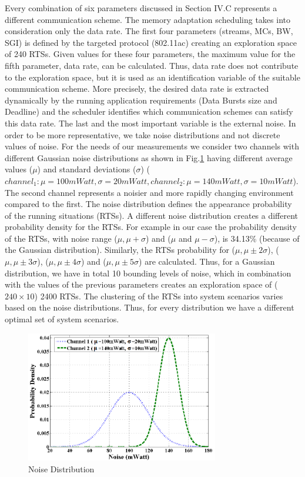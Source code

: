 Every combination of six parameters discussed in Section IV.C represents a different communication scheme. The memory adaptation scheduling takes into consideration only the data rate. The first four parameters (streams, MCs, BW, SGI) is defined by the targeted protocol (802.11ac) \cite{4} creating an exploration space of 240 RTSs. Given values for these four parameters, the maximum value for the fifth parameter, data rate, can be calculated. Thus, data rate does not contribute to the exploration space, but it is used as an identification variable of the suitable communication scheme. More precisely, the desired data rate is extracted dynamically by the running application requirements (Data Bursts size and Deadline) and the scheduler identifies which communication schemes can satisfy this data rate.  
The last and the most important variable is the external noise. In order to be more representative, we take noise distributions and not discrete values of noise.
 For the needs of our measurements we consider two channels with different Gaussian noise distributions as shown in Fig.\ref{fig:F7} having different average values ($\mu$) and standard deviations ($ \sigma $) ($channel_1: \mu  =100mWatt,  \sigma =20mWatt, channel_2:  \mu =140mWatt,  \sigma  = 10mWatt $). 
 The second channel represents a noisier and more rapidly changing environment compared to the first. 
 The noise distribution defines the appearance probability of the running situations (RTSs). 
 A different noise distribution creates a different probability density for the RTSs. For example in our case the probability density of the RTSs, with noise range ($\mu, \mu + \sigma$) and ($\mu$ and $\mu - \sigma$), is 34.13\% (because of the Gaussian distribution). 
 Similarly, the RTSs probability for ($\mu, \mu \pm 2 \sigma$),  ($\mu, \mu \pm 3 \sigma $), ($\mu, \mu \pm 4 \sigma$) and ($\mu, \mu \pm 5 \sigma $) are calculated. 
 Thus, for a Gaussian distribution, we have in total 10 bounding levels of noise, which in combination with the values of the previous parameters creates an exploration space of ($240 \times 10$) 2400 RTSs. The clustering of the RTSs into system scenarios varies based on the noise distributions. Thus, for every distribution we have a different optimal set of system scenarios.

\begin{figure}
\centering
\includegraphics[width=0.75\textwidth]{F/image11.png}
\caption{Noise Distribution}
\label{fig:F7}
\end{figure}	


